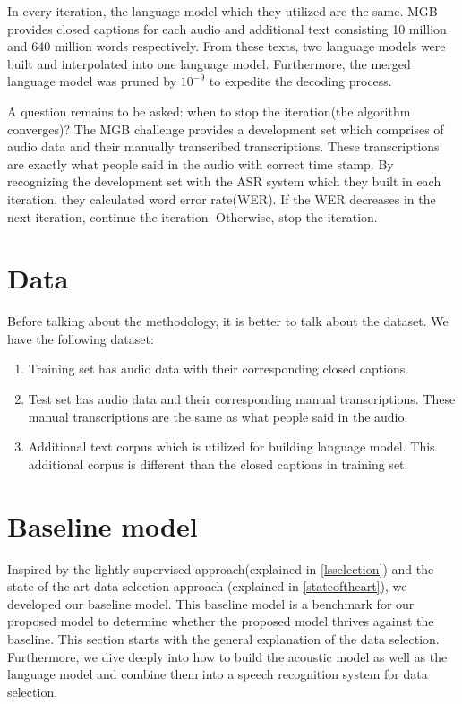 In every iteration, the language model which they utilized are the same. MGB provides closed captions for each audio and additional text consisting 10 million and 640 million words respectively. From these texts, two language models were built and interpolated into one language model. Furthermore, the merged language model was pruned by $10^{-9}$ to expedite the decoding process.

A question remains to be asked: when to stop the iteration(the algorithm converges)? The MGB challenge provides a development set which comprises of audio data and their manually transcribed transcriptions. These transcriptions are exactly what people said in the audio with correct time stamp. By recognizing the development set with the ASR system which they built in each iteration, they calculated word error rate(WER). If the WER decreases in the next iteration, continue the iteration. Otherwise, stop the iteration.



\section{Data}
Before talking about the methodology, it is better to talk about the dataset. We have the following dataset:
\begin{enumerate}
\item Training set has audio data with their corresponding closed captions.
\item Test set has audio data and their corresponding manual transcriptions. These manual transcriptions are the same as what people said in the audio.
\item Additional text corpus which is utilized for building language model. This additional corpus is different than the closed captions in training set. 
\end{enumerate}

\section{Baseline model}
Inspired by the lightly supervised approach(explained in \ref{lsselection})  and the state-of-the-art data selection approach (explained in \ref{stateoftheart}), we developed our baseline model. This baseline model is a benchmark for our proposed model to determine whether the proposed model thrives against the baseline. This section starts with the general explanation of the data selection. Furthermore, we dive deeply into how to build the acoustic model as well as the language model and combine them into a speech recognition system for data selection.

